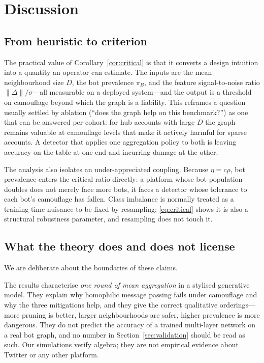\documentclass[onecolumn,pdflatex,sn-basic,Numbered]{sn-jnl}
\theoremstyle{thmstyleone}
\theoremstyle{thmstylethree}
\begin{document}
\section{Discussion}
\label{sec:discussion}

\subsection{From heuristic to criterion}

The practical value of Corollary~\ref{cor:critical} is that it converts a design
intuition into a quantity an operator can estimate. The inputs are the mean
neighbourhood size $D$, the bot prevalence $\pi_B$, and the feature signal-to-noise
ratio $\|\Delta\|/\sigma$---all measurable on a deployed system---and the output is
a threshold on camouflage beyond which the graph is a liability. This reframes a
question usually settled by ablation (``does the graph help on this benchmark?'')
as one that can be answered per-cohort: for hub accounts with large $D$ the graph
remains valuable at camouflage levels that make it actively harmful for sparse
accounts. A detector that applies one aggregation policy to both is leaving
accuracy on the table at one end and incurring damage at the other.

The analysis also isolates an under-appreciated coupling. Because
$\eta = c\rho$, bot prevalence enters the critical ratio directly: a platform whose
bot population doubles does not merely face more bots, it faces a detector whose
tolerance to each bot's camouflage has fallen. Class imbalance is normally treated
as a training-time nuisance to be fixed by resampling; \eqref{eq:critical} shows it
is also a structural robustness parameter, and resampling does not touch it.

\subsection{What the theory does and does not license}

We are deliberate about the boundaries of these claims.

The results characterise \emph{one round of mean aggregation} in a stylised
generative model. They explain why homophilic message passing fails under
camouflage and why the three mitigations help, and they give the correct
qualitative orderings---more pruning is better, larger neighbourhoods are safer,
higher prevalence is more dangerous. They do not predict the accuracy of a trained
multi-layer network on a real bot graph, and no number in
Section~\ref{sec:validation} should be read as such. Our simulations verify
algebra; they are not empirical evidence about Twitter or any other platform.
\end{document}
